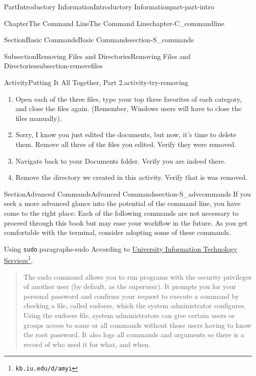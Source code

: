 \documentclass[oneside,10pt,]{book}
\newcommand{\mono}[1]{\texttt{#1}}
\begin{document}
\begin{partptx}{Part}{Introductory Information}{}{Introductory Information}{}{}{part-part-intro}
\begin{chapterptx}{Chapter}{The Command Line}{}{The Command Line}{}{}{chapter-C_commandline}
\begin{sectionptx}{Section}{Basic Commands}{}{Basic Commands}{}{}{section-S_commands}
\begin{subsectionptx}{Subsection}{Removing Files and Directories}{}{Removing Files and Directories}{}{}{subsection-removefiles}
\begin{activity}{Activity}{Putting It All Together, Part 2.}{activity-try-removing}
\begin{enumerate}[font=\bfseries,label=(\alph*),ref=\alph*]
\item{}Open each of the three files, type your top three favorites of each category, and close the files again. (Remember, Windows users will have to close the files manually).%
\item{}Sorry, I know you just edited the documents, but now, it's time to delete them. Remove all three of the files you edited. Verify they were removed.%
\item{}Navigate back to your Documents folder. Verify you are indeed there.%
\item{}Remove the directory we created in this activity. Verify that is was removed.%
\end{enumerate}%
\end{activity}%
\end{subsectionptx}
\end{sectionptx}
%
%
\typeout{************************************************}
\typeout{************************************************}
%
\begin{sectionptx}{Section}{Advanced Commands}{}{Advanced Commands}{}{}{section-S_advcommands}
%
%
%
If you seek a more advanced glance into the potential of the command line, you have come to the right place. Each of the following commands are not necessary to proceed through this book but may ease your workflow in the future. As you get comfortable with the terminal, consider adopting some of these commands.%
\begin{paragraphs}{Using \mono{sudo}.}{paragraphs-sudo}%
%
%
According to \href{https://kb.iu.edu/d/amyi}{University Information Technology Services}\footnote{\nolinkurl{kb.iu.edu/d/amyi}\label{fn-sudo-d-b}},%
\begin{quote}%
The sudo command allows you to run programs with the security privileges of another user (by default, as the superuser). It prompts you for your personal password and confirms your request to execute a command by checking a file, called sudoers, which the system administrator configures. Using the sudoers file, system administrators can give certain users or groups access to some or all commands without those users having to know the root password. It also logs all commands and arguments so there is a record of who used it for what, and when.%
\end{quote}

\end{paragraphs}
\end{sectionptx}
\end{chapterptx}
\end{partptx}
\end{document}
